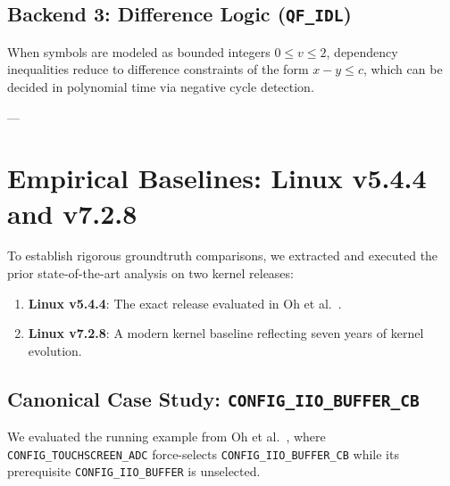 \documentclass[acmsmall,screen,review,nonacm]{acmart}
\begin{document}
\subsection{Backend 3: Difference Logic (\texttt{QF\_IDL})}
When symbols are modeled as bounded integers $0 \le v \le 2$, dependency inequalities reduce to difference constraints of the form $x - y \le c$, which can be decided in polynomial time via negative cycle detection.

---

\section{Empirical Baselines: Linux v5.4.4 and v7.2.8}
\label{sec:baselines}

To establish rigorous groundtruth comparisons, we extracted and executed the prior state-of-the-art analysis on two kernel releases:
\begin{enumerate}
    \item \textbf{Linux v5.4.4}: The exact release evaluated in Oh et al.~\cite{oh2021finding}.
    \item \textbf{Linux v7.2.8}: A modern kernel baseline reflecting seven years of kernel evolution.
\end{enumerate}

\subsection{Canonical Case Study: \texttt{CONFIG\_IIO\_BUFFER\_CB}}
We evaluated the running example from Oh et al.~\cite{oh2021finding}, where \texttt{CONFIG\_TOUCHSCREEN\_ADC} force-selects \texttt{CONFIG\_IIO\_BUFFER\_CB} while its prerequisite \texttt{CONFIG\_IIO\_BUFFER} is unselected.
\end{document}
